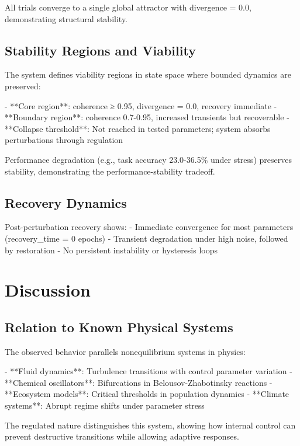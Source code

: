\documentclass[12pt,a4paper]{report}
\begin{document}
All trials converge to a single global attractor with divergence = 0.0, demonstrating structural stability.

\subsection{Stability Regions and Viability}

The system defines viability regions in state space where bounded dynamics are preserved:

- **Core region**: coherence ≥ 0.95, divergence = 0.0, recovery immediate
- **Boundary region**: coherence 0.7-0.95, increased transients but recoverable
- **Collapse threshold**: Not reached in tested parameters; system absorbs perturbations through regulation

Performance degradation (e.g., task accuracy 23.0-36.5\% under stress) preserves stability, demonstrating the performance-stability tradeoff.

\subsection{Recovery Dynamics}

Post-perturbation recovery shows:
- Immediate convergence for most parameters (recovery_time = 0 epochs)
- Transient degradation under high noise, followed by restoration
- No persistent instability or hysteresis loops

\section{Discussion}

\subsection{Relation to Known Physical Systems}

The observed behavior parallels nonequilibrium systems in physics:

- **Fluid dynamics**: Turbulence transitions with control parameter variation
- **Chemical oscillators**: Bifurcations in Belousov-Zhabotinsky reactions
- **Ecosystem models**: Critical thresholds in population dynamics
- **Climate systems**: Abrupt regime shifts under parameter stress

The regulated nature distinguishes this system, showing how internal control can prevent destructive transitions while allowing adaptive responses.
\end{document}
